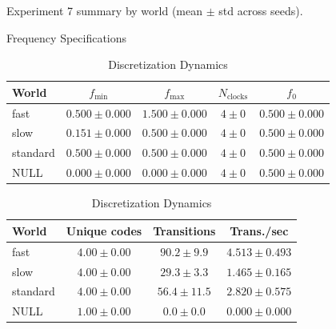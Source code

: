 \begin{table}[t]
    \centering
    \caption{Experiment 7 summary by world (mean $\pm$ std across seeds).}
    \label{tab:ex7}

    \begin{subtable}{\columnwidth}
        \centering
        \caption{Frequency Specifications}
        \begin{tabular}{lcccc}
            \toprule
            World & $f_{\min}$ & $f_{\max}$ & $N_{\mathrm{clocks}}$ & $f_0$ \\
            \midrule
            fast & $0.500 \pm 0.000$ & $1.500 \pm 0.000$ & $4 \pm 0$ & $0.500 \pm 0.000$ \\
            slow & $0.151 \pm 0.000$ & $0.500 \pm 0.000$ & $4 \pm 0$ & $0.500 \pm 0.000$ \\
            standard & $0.500 \pm 0.000$ & $0.500 \pm 0.000$ & $4 \pm 0$ & $0.500 \pm 0.000$ \\
            NULL & $0.000 \pm 0.000$ & $0.000 \pm 0.000$ & $4 \pm 0$ & $0.500 \pm 0.000$ \\
            \bottomrule
        \end{tabular}
    \end{subtable}

    \vspace{0.4cm} %

    \begin{subtable}{\columnwidth}
        \centering
        \caption{Discretization Dynamics}
        \begin{tabular}{lccc}
            \toprule
            World & Unique codes & Transitions & Trans./sec \\
            \midrule
            fast & $4.00 \pm 0.00$ & $90.2 \pm 9.9$ & $4.513 \pm 0.493$ \\
            slow & $4.00 \pm 0.00$ & $29.3 \pm 3.3$ & $1.465 \pm 0.165$ \\
            standard & $4.00 \pm 0.00$ & $56.4 \pm 11.5$ & $2.820 \pm 0.575$ \\
            NULL & $1.00 \pm 0.00$ & $0.0 \pm 0.0$ & $0.000 \pm 0.000$ \\
            \bottomrule
        \end{tabular}
    \end{subtable}
\end{table}
